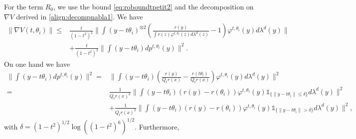 \documentclass{article}
\begin{document}
For the term $R_0$, we use the bound \eqref{eq:roboundtpetit2} and the decomposition on $\nabla V$ derived in \eqref{align:decompnabla1}. We have
\begin{align*}
    \|\nabla V(t,\theta_i)\| \leq & \frac{t}{(1-t^2)^2}\|\int\left(y-t\theta_i\right)^{\otimes2}\left( \frac{r(y)}{\int r(z)\varphi^{t,\theta_i}(z)d\lambda^d(z)}-1\right)\varphi^{t,\theta_i}(y)d\lambda^d(y)\|\nonumber\\
         &+\frac{t}{(1-t^2)^2}\|\int(y-t\theta_i)d p^{t,\theta_i}(y)\|^2.
\end{align*}
On one hand we have
\begin{align*}
    \|\int(y-t\theta_i)d p^{t,\theta_i}(y)\|^2 = &\|\int(y-t\theta_i)\left(\frac{r(y)}{Q_tr(x)}-\frac{r(t\theta_i)}{Q_tr(x)}\right)\varphi^{t,\theta_i}(y)d\lambda^d(y)\|^2\\
    = & \frac{1}{Q_tr(x)^2}\|\int(y-t\theta_i)\left(r(y)-r(\theta_i)\right)\varphi^{t,\theta_i}(y)\mathds{1}_{\{\|y-t\theta_i\|\leq \delta\}}d\lambda^d(y)\|^2
    \\
     & +\frac{1}{Q_tr(x)^2}\|\int(y-t\theta_i)\left(r(y)-r(\theta_i)\right)\varphi^{t,\theta_i}(y)\mathds{1}_{\{\|y-t\theta_i\|> \delta\}}d\lambda^d(y)\|^2,
\end{align*}
with $\delta=(1-t^2)^{1/2}\log((1-t^2)^6)^{1/2}$. Furthermore,
\end{document}
